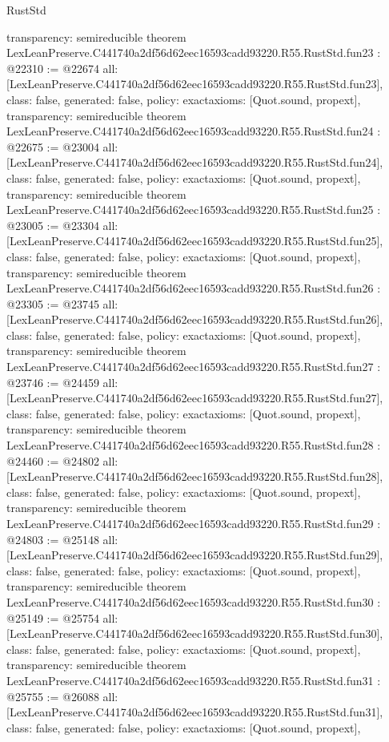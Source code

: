 \begin{lexlean}{RustStd}
\begin{coremodule}
{  transparency: semireducible
}
theorem LexLeanPreserve.C441740a2df56d62eec16593cadd93220.R55.RustStd.fun23 : @22310 := @22674 {
  all: [LexLeanPreserve.C441740a2df56d62eec16593cadd93220.R55.RustStd.fun23],
  class: false,
  generated: false,
  policy: exact{axioms: [Quot.sound, propext]},
  transparency: semireducible
}
theorem LexLeanPreserve.C441740a2df56d62eec16593cadd93220.R55.RustStd.fun24 : @22675 := @23004 {
  all: [LexLeanPreserve.C441740a2df56d62eec16593cadd93220.R55.RustStd.fun24],
  class: false,
  generated: false,
  policy: exact{axioms: [Quot.sound, propext]},
  transparency: semireducible
}
theorem LexLeanPreserve.C441740a2df56d62eec16593cadd93220.R55.RustStd.fun25 : @23005 := @23304 {
  all: [LexLeanPreserve.C441740a2df56d62eec16593cadd93220.R55.RustStd.fun25],
  class: false,
  generated: false,
  policy: exact{axioms: [Quot.sound, propext]},
  transparency: semireducible
}
theorem LexLeanPreserve.C441740a2df56d62eec16593cadd93220.R55.RustStd.fun26 : @23305 := @23745 {
  all: [LexLeanPreserve.C441740a2df56d62eec16593cadd93220.R55.RustStd.fun26],
  class: false,
  generated: false,
  policy: exact{axioms: [Quot.sound, propext]},
  transparency: semireducible
}
theorem LexLeanPreserve.C441740a2df56d62eec16593cadd93220.R55.RustStd.fun27 : @23746 := @24459 {
  all: [LexLeanPreserve.C441740a2df56d62eec16593cadd93220.R55.RustStd.fun27],
  class: false,
  generated: false,
  policy: exact{axioms: [Quot.sound, propext]},
  transparency: semireducible
}
theorem LexLeanPreserve.C441740a2df56d62eec16593cadd93220.R55.RustStd.fun28 : @24460 := @24802 {
  all: [LexLeanPreserve.C441740a2df56d62eec16593cadd93220.R55.RustStd.fun28],
  class: false,
  generated: false,
  policy: exact{axioms: [Quot.sound, propext]},
  transparency: semireducible
}
theorem LexLeanPreserve.C441740a2df56d62eec16593cadd93220.R55.RustStd.fun29 : @24803 := @25148 {
  all: [LexLeanPreserve.C441740a2df56d62eec16593cadd93220.R55.RustStd.fun29],
  class: false,
  generated: false,
  policy: exact{axioms: [Quot.sound, propext]},
  transparency: semireducible
}
theorem LexLeanPreserve.C441740a2df56d62eec16593cadd93220.R55.RustStd.fun30 : @25149 := @25754 {
  all: [LexLeanPreserve.C441740a2df56d62eec16593cadd93220.R55.RustStd.fun30],
  class: false,
  generated: false,
  policy: exact{axioms: [Quot.sound, propext]},
  transparency: semireducible
}
theorem LexLeanPreserve.C441740a2df56d62eec16593cadd93220.R55.RustStd.fun31 : @25755 := @26088 {
  all: [LexLeanPreserve.C441740a2df56d62eec16593cadd93220.R55.RustStd.fun31],
  class: false,
  generated: false,
  policy: exact{axioms: [Quot.sound, propext]},
}
\end{coremodule}
\end{lexlean}
